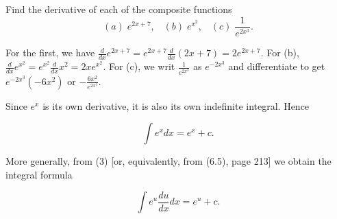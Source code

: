 \begin{example} Find the derivative of each of the composite functions
$$
(a)\; e^{2x+7}, \;\;\; (b)\; e^{x^2}, \;\;\; (c)\; \frac{1}{e^{2x^3}}.
$$

\noindent For the first, we have $\frac{d}{dx} e^{2x+7} = e^{2x + 7} \frac{d}{dx} (2x + 7) = 2e^{2x+7}$. For (b), $\frac{d}{dx} e^{x^2} = e^{x^2} \frac{d}{dx} x^2 = 2xe^{x^2}$. For (c), we writ $\frac{1}{e^{2x^3}}$ as $e^{-2x^3}$ and differentiate to get $e^{-2x^3} (-6x^2)$ or $-\frac{6x^2}{ e^{2x^3}}$.
\end{example}
\medskip

Since $e^{x}$ is its own derivative, it is also its own indefinite integral. Hence

\begin{theorem} %
$$ 
\int e^{x} dx = e^{x} + c.
$$
\end{theorem}

More generally, from (3) [or, equivalently, from (6.5), page 213] we obtain the integral formula

 
\begin{theorem} %
$$
\int e^{u} \frac{du}{dx} dx = e^u + c.
$$
\end{theorem}

